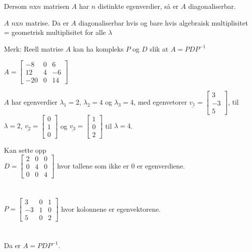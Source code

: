 \documentclass[11pt, a4paper, norsk]{article}
\begin{document}
        \begin{Theorem}{}{}
            Dersom $n$x$n$ matrisen $A$ har $n$ distinkte egenverdier, så er $A$ diagonaliserbar. 
        \end{Theorem}

        \begin{Theorem}{}{}
            $A$ $n$x$n$ matrise. Da er $A$ diagonaliserbar hvis og bare hvis algebraisk multiplisitet = geometrisk multiplisitet for alle $\lambda$
        \end{Theorem}

        Merk: Reell matrise $A$ kan ha kompleks $P$ og $D$ slik at $A = PDP^{-1}$

        \begin{Example}{}{}
            $A = \begin{bmatrix}
                -8 & 0 & 6 \\
                12 & 4 & -6 \\
                -20 & 0 & 14
            \end{bmatrix}$

            $A$ har egenverdier $\lambda_1 = 2$, $\lambda_2 = 4$ og $\lambda_3 = 4$, med egenvetorer $\underline{v_1} = \begin{bmatrix}
                3 \\
                -3 \\
                5
            \end{bmatrix}$, til $\lambda = 2$, $\underline{v_2} = \begin{bmatrix}
                0 \\
                1 \\
                0
            \end{bmatrix}$ og $\underline{v_3} = \begin{bmatrix}
                1 \\
                0 \\
                2
            \end{bmatrix}$ til $\lambda = 4$.

            Kan sette opp 
            \\
            $D = \begin{bmatrix}
                2 & 0 & 0 \\
                0 & 4 & 0 \\
                0 & 0 & 4
            \end{bmatrix}$ hvor tallene som ikke er $0$ er egenverdiene.
            \\
            \\
            \\
            $P = \begin{bmatrix}
                3 & 0 & 1 \\
                -3 & 1 & 0 \\
                5 & 0 & 2
            \end{bmatrix}$ hvor kolonnene er egenvektorene.
            \\
            \\
            \\
            Da er $A = PDP^{-1}$. 
        \end{Example}
\end{document}
